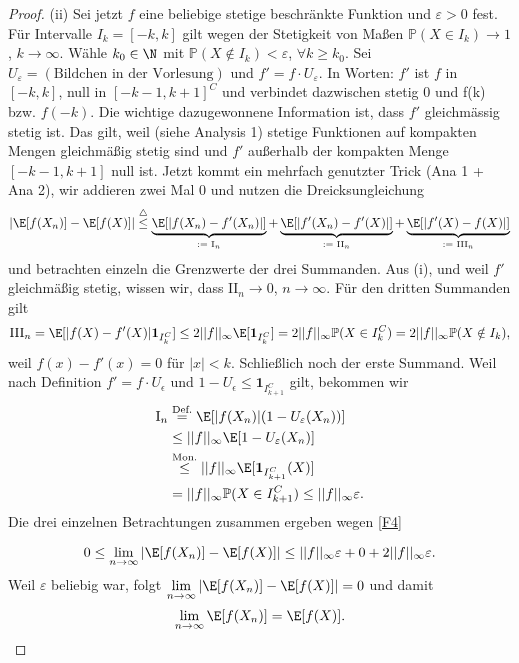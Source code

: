 \begin{proof}
		(ii) Sei jetzt $f$ eine beliebige stetige beschr\"ankte Funktion und $\varepsilon>0$ fest. %
			 F\"ur Intervalle $I_k = [-k,k]$ gilt wegen der Stetigkeit von Maßen $\mathbb{P}(X\in I_k) \to 1$, $k \to \infty$. Wähle $k_0 \in \N$ mit $\mathbb{P}(X \notin I_k) < \varepsilon$, $\forall k \geq k_0$. Sei $U_{\varepsilon} = (\text{Bildchen in der Vorlesung})$ und $f' = f \cdot U_{\varepsilon}$. In Worten: $f'$ ist $f$ in $[-k,k]$, null in $[-k-1,k+1]^C$ und verbindet dazwischen stetig $0$ und f(k) bzw. $f(-k)$. Die wichtige dazugewonnene Information ist, dass $f'$ gleichm\"assig stetig ist. Das gilt, weil (siehe Analysis 1) stetige Funktionen auf kompakten Mengen gleichm\"a\ss ig stetig sind und $f'$ au\ss erhalb der kompakten Menge $[-k-1,k+1]$ null ist. Jetzt kommt ein mehrfach genutzter Trick (Ana 1 + Ana 2), wir addieren zwei Mal $0$ und nutzen die Dreicksungleichung
			 \begin{align}\label{F4}
				  |\E[f(X_n)] - \E[f(X)]|
			 	\overset{\triangle}{\leq} \underbrace{\E[|f(X_n) - f'(X_n)|]}_{:= \text{ I}_n} + \underbrace{\E[|f'(X_n) - f'(X)|]}_{:= \text{ II}_n} + \underbrace{\E[|f'(X) - f(X)|]}_{:= \text{ III}_n}
			 \end{align}
			 und betrachten einzeln die Grenzwerte der drei Summanden. Aus (i), und weil $f'$ gleichmäßig stetig, wissen wir, dass $\text{II}_n \to 0$, $n \to \infty$. F\"ur den dritten Summanden gilt
			 \begin{align*}
			 	\text{III}_n = \E[|f(X) - f'(X)| \mathbf{1}_{I_k^C}] \leq 2||f||_{\infty} \E[\mathbf{1}_{I_k^C}]
			 	= 2||f||_{\infty} \mathbb{P}(X \in I_k^C)
				= 2||f||_{\infty} \mathbb{P}(X \notin I_k),
			 \end{align*}
			 weil $f(x)-f'(x)=0$ f\"ur $|x|<k$. Schlie\ss lich noch der erste Summand. Weil nach Definition $f'=f\cdot U_\epsilon$ und $1-U_\epsilon \leq \mathbf 1_{I_{k+1}^C}$ gilt, bekommen wir
			\begin{align*}
			 	\text{I}_n &\overset{\text{Def.}}{=} \E[|f(X_n)|(1-U_{\varepsilon}(X_n))] \\
			 	&\leq ||f||_{\infty} \E[1-U_{\varepsilon}(X_n)]\\
				&\overset{\text{Mon.}}{\leq} ||f||_{\infty} \E[\mathbf{1}_{I_{k+1}^C}(X)]\\
			 	&= ||f||_{\infty} \mathbb{P}(X \in I_{k+1}^C) \leq ||f||_{\infty} \varepsilon.
			 \end{align*}
			 Die drei einzelnen Betrachtungen zusammen ergeben wegen \eqref{F4}
			 
			  \[0\leq \lim\limits_{n \to \infty} |\E[f(X_n)] - \E[f(X)]| \leq ||f||_{\infty} \varepsilon + 0 + 2||f||_{\infty}\varepsilon. \] 
			 Weil $\varepsilon$ beliebig war, folgt $\lim\limits_{n \to \infty} |\E[f(X_n)] - \E[f(X)]|=0$ und damit \[ \lim\limits_{n \to \infty} \E[f(X_n)] = \E[f(X)]. \] 



\end{proof}

